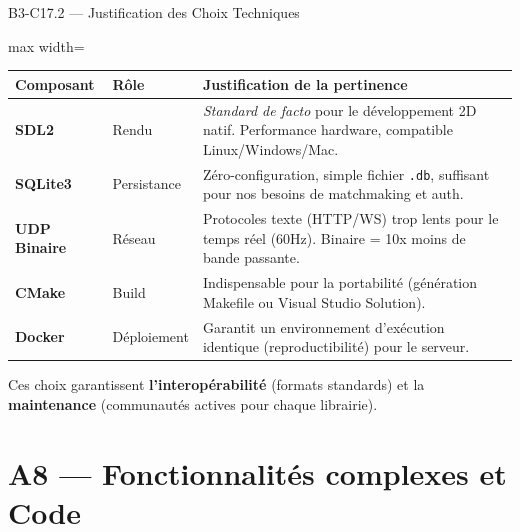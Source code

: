 \documentclass[aspectratio=169,10pt]{beamer}
\begin{document}
\begin{frame}{B3-C17.2 — Justification des Choix Techniques}
  \footnotesize
  \begin{adjustbox}{max width=\textwidth}
  \begin{tabular}{l l l}
  \toprule
  \textbf{Composant} & \textbf{Rôle} & \textbf{Justification de la pertinence} \\
  \midrule
  \textbf{SDL2} & Rendu & \textit{Standard de facto} pour le développement 2D natif. Performance hardware, compatible Linux/Windows/Mac. \\ \hline
  \textbf{SQLite3} & Persistance & Zéro-configuration, simple fichier \texttt{.db}, suffisant pour nos besoins de matchmaking et auth. \\ \hline
  \textbf{UDP Binaire} & Réseau & Protocoles texte (HTTP/WS) trop lents pour le temps réel (60Hz). Binaire = 10x moins de bande passante. \\ \hline
  \textbf{CMake} & Build & Indispensable pour la portabilité (génération Makefile ou Visual Studio Solution). \\ \hline
  \textbf{Docker} & Déploiement & Garantit un environnement d'exécution identique (reproductibilité) pour le serveur. \\
  \bottomrule
  \end{tabular}
  \end{adjustbox}
  
  \vspace{0.5em}
  Ces choix garantissent \textbf{l'interopérabilité} (formats standards) et la \textbf{maintenance} (communautés actives pour chaque librairie).
\end{frame}

\section{A8 — Fonctionnalités complexes et Code}
\end{document}
